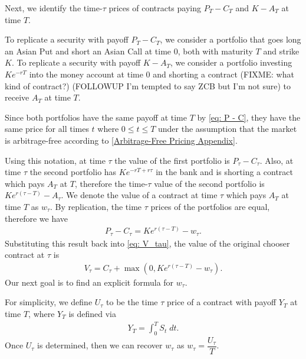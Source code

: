 \documentclass[reqno]{amsart}
\begin{document}
Next, we identify the time-$\tau$ prices of contracts paying $P_T - C_T$ and $K - A_T$ at time $T$.

To replicate a security with payoff $P_T - C_T$, we consider a portfolio that goes long an Asian Put and short an Asian Call at time $0$, both with maturity $T$ and strike $K$.
To replicate a security with payoff $K - A_T$,  we consider a portfolio investing $Ke^{-rT}$ into the money account at time 0 and shorting a contract (FIXME: what kind of contract?) (FOLLOWUP I'm tempted to say ZCB but I'm not sure) to receive $A_T$ at time $T$. 

Since both portfolios have the same payoff at time $T$ by \eqref{eq: P - C},
they have the same price for all times $t$ where $0 \leq t \leq T$ under the assumption that the market is
arbitrage-free according to \ref{Arbitrage-Free Pricing Appendix}.


Using this notation, at time $\tau$ the value of the first portfolio is $P_\tau - C_\tau$.
 Also, at time $\tau$ the second portfolio has $Ke^{-rT + r\tau}$ in the bank and is shorting a contract which pays $A_T$ at $T$, therefore the time-$\tau$ value of the second portfolio is $Ke^{r(\tau - T)} - A_\tau$. We denote the value of a contract at time $\tau$ which pays $A_T$ at time $T$ as $w_\tau$.
By replication, the time $\tau$ prices of the portfolios are equal, therefore we have 
\begin{align}\label{eq: P-C Parity}
     P_\tau - C_\tau = Ke^{r(\tau - T)} - w_\tau.
\end{align}
Substituting this result back into \eqref{eq: V_tau}, the value of the original chooser contract at $\tau$ is
\begin{align} \label{V_tau Asian Chooser}
     V_\tau = C_\tau + \max(0, Ke^{r(\tau - T)} - w_\tau).
\end{align}
Our next goal is to find an explicit formula for $w_\tau$. 

For simplicity, we define $U_\tau$ to be the time $\tau$ price of a contract with payoff $Y_T$ at time $T$, where $Y_T$ is defined via
\begin{align}\label{eq: y}
     Y_T = \int_0^T S_t \; dt.
\end{align}
Once $U_\tau$ is determined, then we can recover $w_\tau$ as $w_\tau = \dfrac{U_\tau}{T}$. 
\end{document}
